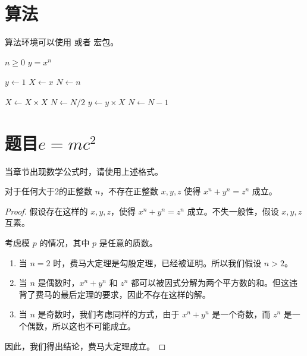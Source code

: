 \section{算法}

算法环境可以使用  或者  宏包。

\renewcommand{\algorithmicrequire}{\textbf{输入：}\unskip}
\renewcommand{\algorithmicensure}{\textbf{输出：}\unskip}

\begin{algorithm}
  \caption{Calculate $y = x^n$}
  \label{alg1}
  \small
  \begin{algorithmic}
    \REQUIRE $n \geq 0$
    \ENSURE $y = x^n$

    \STATE $y \leftarrow 1$
    \STATE $X \leftarrow x$
    \STATE $N \leftarrow n$

        \STATE $X \leftarrow X \times X$
        \STATE $N \leftarrow N / 2$
      \ELSE[$N$ is odd]
        \STATE $y \leftarrow y \times X$
        \STATE $N \leftarrow N - 1$
      \ENDIF
    \ENDWHILE
  \end{algorithmic}
\end{algorithm}



\section{题目\texorpdfstring{\(e=mc^2\)}{e=mc2}}

当章节出现数学公式时，请使用上述格式。

\begin{theorem}[费马大定理]
对于任何大于2的正整数 $n$，不存在正整数 $x, y, z$ 使得 $x^n + y^n = z^n$ 成立。
\end{theorem}

\begin{proof}
假设存在这样的 $x, y, z$，使得 $x^n + y^n = z^n$ 成立。不失一般性，假设 $x, y, z$ 互素。

考虑模 $p$ 的情况，其中 $p$ 是任意的质数。

\begin{enumerate}
\item 当 $n = 2$ 时，费马大定理是勾股定理，已经被证明。所以我们假设 $n > 2$。
\item 当 $n$ 是偶数时，$x^n + y^n$ 和 $z^n$ 都可以被因式分解为两个平方数的和。但这违背了费马的最后定理的要求，因此不存在这样的解。
\item 当 $n$ 是奇数时，我们考虑同样的方式，由于 $x^n + y^n$ 是一个奇数，而 $z^n$ 是一个偶数，所以这也不可能成立。
\end{enumerate}

因此，我们得出结论，费马大定理成立。
\end{proof}
